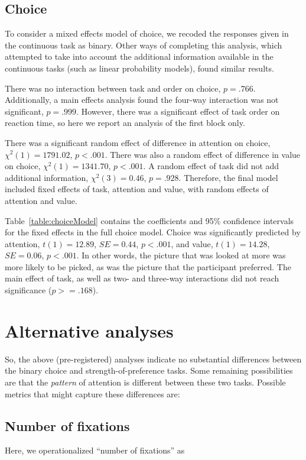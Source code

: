 \documentclass[12pt]{article}
\begin{document}
\subsection{Choice}
To consider a mixed effects model of choice, we recoded the responses given in the continuous task as binary. Other ways of completing this analysis, which attempted to take into account the additional information available in the continuous tasks (such as linear probability models), found similar results. 

There was no interaction between task and order on choice, $p=.766$. Additionally, a main effects analysis found the four-way interaction was not significant, $p=.999$. However, there was a significant effect of task order on reaction time, so here we report an analysis of the first block only. 

 

There was a significant random effect of difference in attention on choice, $\chi^2(1)=1791.02$, $p<.001$. There was also a random effect of difference in value on choice, $\chi^2(1)=1341.70$, $p<.001$. A random effect of task did not add additional information, $\chi^2(3)=0.46$, $p=.928$. Therefore, the final model included fixed effects of task, attention and value, with random effects of attention and value.

Table~\ref{table:choiceModel} contains the coefficients and 95\% confidence intervals for the fixed effects in the full choice model. Choice was significantly predicted by attention, $t(1)=12.89$, $SE=0.44$, $p<.001$, and value, $t(1)=14.28$, $SE=0.06$, $p<.001$. In other words, the picture that was looked at more was more likely to be picked, as was the picture that the participant preferred. The main effect of task, as well as two- and three-way interactions did not reach significance ($p>=.168$).

\newpage
\section{Alternative analyses}
So, the above (pre-registered) analyses indicate no substantial differences between the binary choice and strength-of-preference tasks. Some remaining possibilities are that the \emph{pattern} of attention is different between these two tasks. Possible metrics that might capture these differences are:

\subsection{Number of fixations}
Here, we operationalized ``number of fixations'' as 
\end{document}
